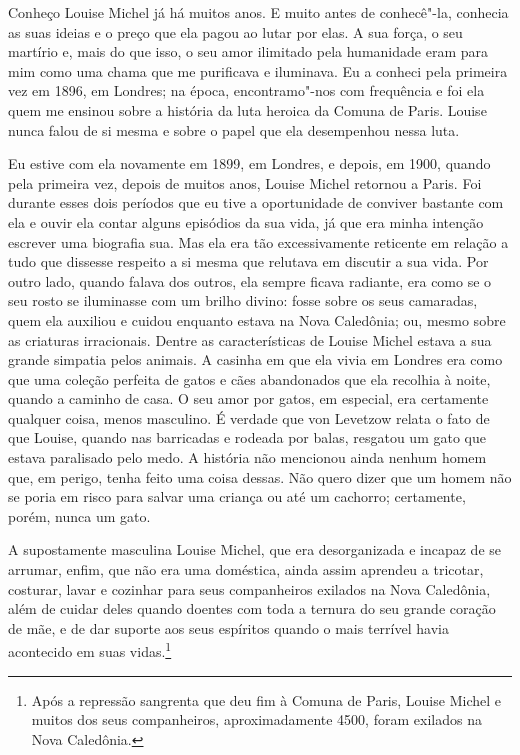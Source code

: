 Conheço Louise Michel já há muitos anos. E muito antes de conhecê"-la,
conhecia as suas ideias e o preço que ela pagou ao lutar por elas. A sua
força, o seu martírio e, mais do que isso, o seu amor ilimitado pela
humanidade eram para mim como uma chama que me purificava e iluminava.
Eu a conheci pela primeira vez em 1896, em Londres; na época,
encontramo"-nos com frequência e foi ela quem me ensinou sobre a história
da luta heroica da Comuna de Paris. Louise nunca falou de si mesma e
sobre o papel que ela desempenhou nessa luta.

Eu estive com ela novamente em 1899, em Londres, e depois, em 1900,
quando pela primeira vez, depois de muitos anos, Louise Michel retornou
a Paris. Foi durante esses dois períodos que eu tive a oportunidade de
conviver bastante com ela e ouvir ela contar alguns episódios da sua
vida, já que era minha intenção escrever uma biografia sua. Mas ela era
tão excessivamente reticente em relação a tudo que dissesse respeito a
si mesma que relutava em discutir a sua vida. Por outro lado, quando
falava dos outros, ela sempre ficava radiante, era como se o seu rosto
se iluminasse com um brilho divino: fosse sobre os seus camaradas, quem
ela auxiliou e cuidou enquanto estava na Nova Caledônia; ou, mesmo sobre
as criaturas irracionais. Dentre as características de Louise Michel
estava a sua grande simpatia pelos animais. A casinha em que ela vivia
em Londres era como que uma coleção perfeita de gatos e cães abandonados
que ela recolhia à noite, quando a caminho de casa. O seu amor por
gatos, em especial, era certamente qualquer coisa, menos masculino. É
verdade que von Levetzow relata o fato de que Louise, quando nas
barricadas e rodeada por balas, resgatou um gato que estava paralisado
pelo medo. A história não mencionou ainda nenhum homem que, em perigo,
tenha feito uma coisa dessas. Não quero dizer que um homem não se poria
em risco para salvar uma criança ou até um cachorro; certamente, porém,
nunca um gato.

A supostamente masculina Louise Michel, que era desorganizada e incapaz
de se arrumar, enfim, que não era uma doméstica, ainda assim aprendeu a
tricotar, costurar, lavar e cozinhar para seus companheiros exilados na
Nova Caledônia, além de cuidar deles quando doentes com toda a ternura
do seu grande coração de mãe, e de dar suporte aos seus espíritos quando
o mais terrível havia acontecido em suas vidas.\footnote{Após a
  repressão sangrenta que deu fim à Comuna de Paris, Louise Michel e
  muitos dos seus companheiros, aproximadamente 4500, foram exilados na
  Nova Caledônia.}

